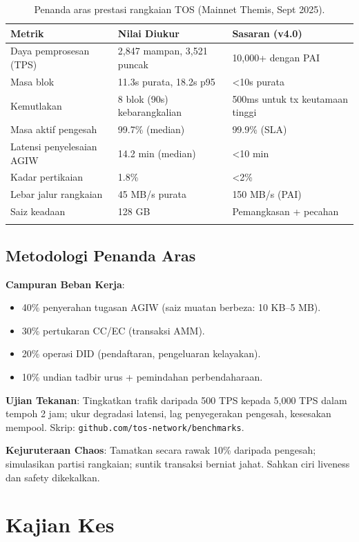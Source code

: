 \documentclass[11pt]{article}
\begin{document}
\begin{longtable}{@{}p{}p{}p{}@{}}
\toprule
\textbf{Metrik} & \textbf{Nilai Diukur} & \textbf{Sasaran (v4.0)} \\\midrule
Daya pemprosesan (TPS) & 2,847 mampan, 3,521 puncak & 10,000+ dengan PAI \\
Masa blok & 11.3s purata, 18.2s p95 & <10s purata \\
Kemutlakan & 8 blok (90s) kebarangkalian & 500ms untuk tx keutamaan tinggi \\
Masa aktif pengesah & 99.7\% (median) & 99.9\% (SLA) \\
Latensi penyelesaian AGIW & 14.2 min (median) & <10 min \\
Kadar pertikaian & 1.8\% & <2\% \\
Lebar jalur rangkaian & 45 MB/s purata & 150 MB/s (PAI) \\
Saiz keadaan & 128 GB & Pemangkasan + pecahan \\
\bottomrule
\caption{Penanda aras prestasi rangkaian TOS (Mainnet Themis, Sept 2025).}
\end{longtable}

\subsection{Metodologi Penanda Aras}

\textbf{Campuran Beban Kerja}:
\begin{itemize}[noitemsep]
  \item 40\% penyerahan tugasan AGIW (saiz muatan berbeza: 10 KB--5 MB).
  \item 30\% pertukaran CC/EC (transaksi AMM).
  \item 20\% operasi DID (pendaftaran, pengeluaran kelayakan).
  \item 10\% undian tadbir urus + pemindahan perbendaharaan.
\end{itemize}

\textbf{Ujian Tekanan}: Tingkatkan trafik daripada 500 TPS kepada 5,000 TPS dalam tempoh 2 jam; ukur degradasi latensi, lag penyegerakan pengesah, kesesakan mempool. Skrip: \texttt{github.com/tos-network/benchmarks}.

\textbf{Kejuruteraan Chaos}: Tamatkan secara rawak 10\% daripada pengesah; simulasikan partisi rangkaian; suntik transaksi berniat jahat. Sahkan ciri liveness dan safety dikekalkan.

\section{Kajian Kes}
\label{sec:case-studies}
\end{document}
